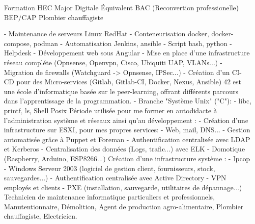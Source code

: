 \documentclass[
	a4paper,
]{FortySecondsCV/fortysecondscv}
\begin{document}
\makefrontsidebar

\begin{cvtable}[1.5]
		{Formation HEC Major Digitale}
		{Équivalent BAC (Reconvertion professionelle)}
		{BEP/CAP Plombier chauffagiste}
\end{cvtable}

\begin{cvtable}[3]
 	{
  		\tabto{2mm}- Maintenance de serveurs Linux RedHat
    		\tabto{2mm}- Conteneurisation docker, docker-compose, podman
      		\tabto{2mm}- Automatisation Jenkins, ansible
		\tabto{2mm}- Script bash, python
	}
 	{
  		\tabto{2mm}- Helpdesk
	}
		{
			\tabto{2mm}- Développement web sous Angular
			\tabto{2mm}- Mise en place  d'une infrastructure réseau compléte (Opnsense, Openvpn, Cisco, Ubiquiti UAP, VLANs...)
			\tabto{2mm}- Migration de firewalls (Watchguard -> Opnsense, IPSec...)
			\tabto{2mm}- Création d'un CI-CD pour des Micro-services (Gitlab, Gitlab-CI, Docker, Nexus, Ansible)
		}
	{
	42 est une école d'informatique basée sur le peer-learning, offrant différents parcours dans l'apprentissage de la programmation.
		\tabto{2mm}- Branche "Système Unix" ("C"):
   			\tabto{4mm}- libc, printf, ls, Shell Posix
	}
	{
		Période utilisée pour me former en autodidacte à l'administration système et réseaux ainsi qu'au développement :
		\tabto{2mm}- Création d'une infrastructure sur ESXI, pour mes propres services:
			\tabto{4mm}- Web, mail, DNS...
			\tabto{4mm}- Gestion automatisée grâce à Puppet et Foreman
			\tabto{4mm}- Authentification centralisée avec LDAP et Kerberos
			\tabto{4mm}- Centralisation des données (Logs, trafic...) avec ELK
		\tabto{2mm}- Domotique (Raspberry, Arduino, ESP8266...)
	}
	{
		Création d'une infrastructure système :
			\tabto{2mm}- Ipcop
			\tabto{2mm}- Windows Serveur 2003 (logiciel de gestion client, fournisseurs, stock, sauvegardes...)
			\tabto{2mm}- Authentification centralisée avec Active Directory
			\tabto{2mm}- VPN employés et clients
			\tabto{2mm}- PXE (installation, sauvegarde, utilitaires de dépannage...)
	}
	{
		Technicien de maintenance informatique particuliers et professionnels, Manutentionnaire, Démolition, Agent de production agro-alimentaire, Plombier chauffagiste, Electricien.
	}
	{ }
\end{cvtable}
\end{document}
